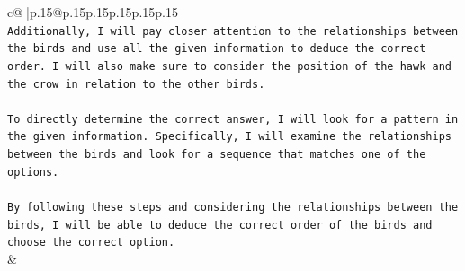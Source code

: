 \documentclass{article}
\begin{document}
{\begin{supertabular}{c@{$\;$}|p{.15\linewidth}@{}p{.15\linewidth}p{.15\linewidth}p{.15\linewidth}p{.15\linewidth}p{.15\linewidth}}
{{{\\ 
\texttt{Additionally, I will pay closer attention to the relationships between the birds and use all the given information to deduce the correct order. I will also make sure to consider the position of the hawk and the crow in relation to the other birds.} \\
\\ 
\texttt{To directly determine the correct answer, I will look for a pattern in the given information. Specifically, I will examine the relationships between the birds and look for a sequence that matches one of the options.} \\
\\ 
\texttt{By following these steps and considering the relationships between the birds, I will be able to deduce the correct order of the birds and choose the correct option.} \\
            }
        }
    }
    & \\ \\

\end{supertabular}
}
\end{document}
